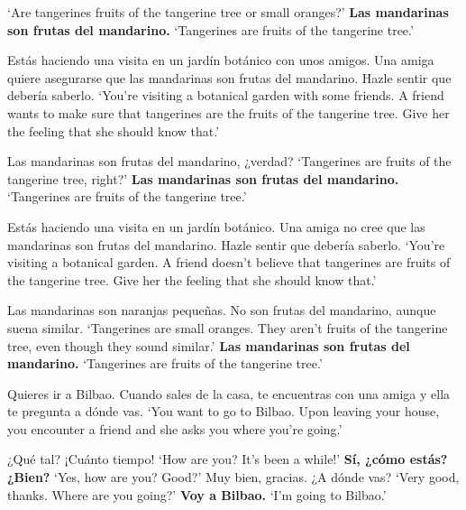\begin{exe}
\begin{xlist}[A:]
	\glt `Are tangerines fruits of the tangerine tree or small oranges?' 
	 \textbf{Las mandarinas son frutas del mandarino.}  
	\glt `Tangerines are fruits of the tangerine tree.' 
	\end{xlist}
\ex \label{ex:experimentoOBVCONFmandarin_APP}
	Estás haciendo una visita en un jardín botánico con unos amigos. Una amiga quiere asegurarse que las mandarinas son frutas del mandarino. Hazle sentir que debería saberlo. 
	\glt `You're visiting a botanical garden with some friends. A friend wants to make sure that tangerines are the fruits of the tangerine tree. Give her the feeling that she should know that.' 
	\begin{xlist}[A:]
	 Las mandarinas son frutas del mandarino, ¿verdad? \href{https://osf.io/ay4n7/}{\faVolumeUp}
	\glt `Tangerines are fruits of the tangerine tree, right?' 
	 \textbf{Las mandarinas son frutas del mandarino.}  
	\glt `Tangerines are fruits of the tangerine tree.' 
	\end{xlist}
\ex \label{ex:experimentoOBVDENmandarin_APP}
	Estás haciendo una visita en un jardín botánico. Una amiga no cree que las mandarinas son frutas del mandarino. Hazle sentir que debería saberlo. 
	\glt `You're visiting a botanical garden. A friend doesn't believe that tangerines are fruits of the tangerine tree. Give her the feeling that she should know that.' 
	\begin{xlist}[A:]
	 Las mandarinas son naranjas pequeñas. No son frutas del mandarino, aunque suena similar. \href{https://osf.io/6bzmt/}{\faVolumeUp}
	\glt `Tangerines are small oranges. They aren't fruits of the tangerine tree, even though they sound similar.' 
	 \textbf{Las mandarinas son frutas del mandarino.}  
	\glt `Tangerines are fruits of the tangerine tree.' 
	\end{xlist}
\ex \label{ex:experimentoNEUTRALDECLbilbao_APP}
	Quieres ir a Bilbao. Cuando sales de la casa, te encuentras con una amiga y ella te pregunta a dónde vas. 
	\glt `You want to go to Bilbao. Upon leaving your house, you encounter a friend and she asks you where you're going.' 
	\begin{xlist}[A:]
	 ¿Qué tal? ¡Cuánto tiempo! \href{https://osf.io/5mf47/}{\faVolumeUp}
	\glt `How are you? It's been a while!' 
	 \textbf{Sí, ¿cómo estás? ¿Bien?} 
	\glt `Yes, how are you? Good?' 
	 Muy bien, gracias. ¿A dónde vas? \href{https://osf.io/qm5x6/}{\faVolumeUp}
	\glt `Very good, thanks. Where are you going?' 
	 \textbf{Voy a Bilbao.} 
	\glt `I'm going to Bilbao.' 

\end{xlist}
\end{exe}
